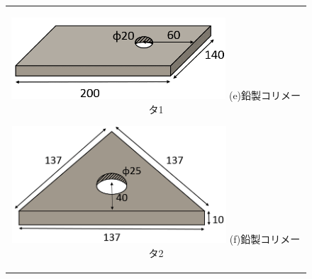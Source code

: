 \begin{figure}[H]
	\centering
		\begin{tabular}{c}
			\begin{minipage}{0.5\hsize}
				\centering
					\includegraphics[width=80mm]{fig/isb/leadcollimator1.png}
					\hspace{1.6cm} (e)鉛製コリメータ1
			\end{minipage}
			\begin{minipage}{0.5\hsize}
				\centering
					\includegraphics[width=80mm]{fig/isb/leadcollimator2.png}
					\hspace{1.6cm} (f)鉛製コリメータ2
			\end{minipage}
		\end{tabular}
\end{figure}
\newpage
